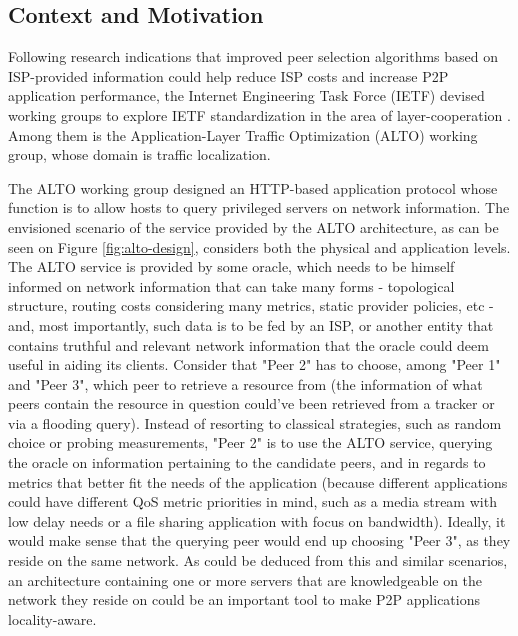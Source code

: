 \documentclass[
  oneside,
  11pt, a4paper,
  footinclude=true,
  headinclude=true,
  cleardoublepage=empty
]{scrbook}
\begin{document}
	\subsection{Context and Motivation}
	
	
    Following research indications that improved peer selection algorithms based on ISP-provided information could help reduce ISP costs and increase P2P application performance, the Internet Engineering Task Force (IETF) devised working groups to explore IETF standardization in the area of layer-cooperation \cite{seedorf2009}. Among them is the Application-Layer Traffic Optimization (ALTO) working group, whose domain is traffic localization.
    
    The ALTO working group designed an HTTP-based application protocol whose function is to allow hosts to query privileged servers on network information. The envisioned scenario of the service provided by the ALTO architecture, as can be seen on Figure \ref{fig:alto-design}, considers both the physical and application levels. The ALTO service is provided by some oracle, which needs to be himself informed on network information that can take many forms - topological structure, routing costs considering many metrics, static provider policies, etc - and, most importantly, such data is to be fed by an ISP, or another entity that contains truthful and relevant network information that the oracle could deem useful in aiding its clients. Consider that "Peer 2" has to choose, among "Peer 1" and "Peer 3", which peer to retrieve a resource from (the information of what peers contain the resource in question could've been retrieved from a tracker or via a flooding query). Instead of resorting to classical strategies, such as random choice or probing measurements, "Peer 2" is to use the ALTO service, querying the oracle on information pertaining to the candidate peers, and in regards to metrics that better fit the needs of the application (because different applications could have different QoS metric priorities in mind, such as a media stream with low delay needs or a file sharing application with focus on bandwidth). Ideally, it would make sense that the querying peer would end up choosing "Peer 3", as they reside on the same network. As could be deduced from this and similar scenarios, an architecture containing one or more servers that are knowledgeable on the network they reside on could be an important tool to make P2P applications locality-aware. 
    
\end{document}
